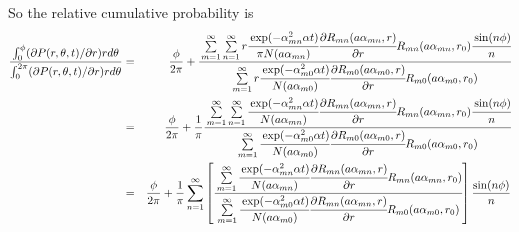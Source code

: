 \documentclass{article}
\begin{document}
%
So the relative cumulative probability is
%
\begin{eqnarray}
    \frac{\int_0^{\phi} (\partial P(r, \theta, t)/\partial r) rd\theta}
         {\int_0^{2\pi} (\partial P(r, \theta, t)/\partial r) rd\theta}
    &=& \frac{\phi}{2\pi} +
    \cfrac{
        \sum\limits_{m=1}^{\infty}\sum\limits_{n=1}^{\infty}
        r\cfrac{\exp(-\alpha_{mn}^2\alpha t)}{\pi N(a\alpha_{mn})}
        \cfrac{\partial R_{mn}(a\alpha_{mn}, r)}{\partial r}
        R_{mn}(a\alpha_{mn}, r_0)
        \cfrac{\sin(n\phi)}{n}
    }{
        \sum\limits_{m=1}^{\infty}
        r\cfrac{\exp(-\alpha_{m0}^2\alpha t)}{N(a\alpha_{m0})}
        \cfrac{\partial R_{m0}(a\alpha_{m0}, r)}{\partial r}
        R_{m0}(a\alpha_{m0}, r_0)
    }
\nonumber\\
    &=& \frac{\phi}{2\pi} + \frac{1}{\pi}
    \cfrac{
        \sum\limits_{m=1}^{\infty}\sum\limits_{n=1}^{\infty}
        \cfrac{\exp(-\alpha_{mn}^2\alpha t)}{N(a\alpha_{mn})}
        \cfrac{\partial R_{mn}(a\alpha_{mn}, r)}{\partial r}
        R_{mn}(a\alpha_{mn}, r_0) \cfrac{\sin(n\phi)}{n}
    }{
        \sum\limits_{m=1}^{\infty}
        \cfrac{\exp(-\alpha_{m0}^2\alpha t)}{N(a\alpha_{m0})}
        \cfrac{\partial R_{m0}(a\alpha_{m0}, r)}{\partial r}
        R_{m0}(a\alpha_{m0}, r_0)
    }
\nonumber\\
    &=& \frac{\phi}{2\pi} + \frac{1}{\pi}\sum_{n=1}^{\infty}\left[
    \cfrac{
        \sum\limits_{m=1}^{\infty}
        \cfrac{\exp(-\alpha_{mn}^2\alpha t)}{N(a\alpha_{mn})}
        \cfrac{\partial R_{mn}(a\alpha_{mn}, r)}{\partial r}
        R_{mn}(a\alpha_{mn}, r_0)
    }{
        \sum\limits_{m=1}^{\infty}
        \cfrac{\exp(-\alpha_{m0}^2\alpha t)}{N(a\alpha_{m0})}
        \cfrac{\partial R_{mn}(a\alpha_{mn}, r)}{\partial r}
        R_{m0}(a\alpha_{m0}, r_0)
    }
    \right] \frac{\sin(n\phi)}{n}
\end{eqnarray}
\end{document}
